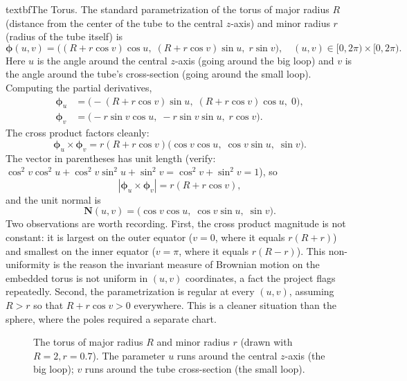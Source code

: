 \documentclass{article}
\begin{document}
textbf{The Torus.} The standard parametrization of the torus of major radius $R$ (distance from the center of the tube to the central $z$-axis) and minor radius $r$ (radius of the tube itself) is
$$\boldsymbol{\phi}(u, v) = \big((R + r\cos v)\cos u,\; (R + r\cos v)\sin u,\; r\sin v\big), \quad (u, v) \in [0, 2\pi) \times [0, 2\pi).$$
Here $u$ is the angle around the central $z$-axis (going around the big loop) and $v$ is the angle around the tube's cross-section (going around the small loop). Computing the partial derivatives,
\begin{align*}
\boldsymbol{\phi}_u &= \big(-(R + r\cos v)\sin u,\; (R + r\cos v)\cos u,\; 0\big), \\
\boldsymbol{\phi}_v &= \big(-r\sin v\cos u,\; -r\sin v\sin u,\; r\cos v\big).
\end{align*}
The cross product factors cleanly:
$$\boldsymbol{\phi}_u \times \boldsymbol{\phi}_v = r(R + r\cos v)\big(\cos v\cos u,\; \cos v\sin u,\; \sin v\big).$$
The vector in parentheses has unit length (verify: $\cos^2 v\cos^2 u + \cos^2 v\sin^2 u + \sin^2 v = \cos^2 v + \sin^2 v = 1$), so
$$|\boldsymbol{\phi}_u \times \boldsymbol{\phi}_v| = r(R + r\cos v),$$
and the unit normal is
$$\mathbf{N}(u, v) = \big(\cos v\cos u,\; \cos v\sin u,\; \sin v\big).$$
Two observations are worth recording. First, the cross product magnitude is not constant: it is largest on the outer equator ($v = 0$, where it equals $r(R + r)$) and smallest on the inner equator ($v = \pi$, where it equals $r(R - r)$). This non-uniformity is the reason the invariant measure of Brownian motion on the embedded torus is not uniform in $(u, v)$ coordinates, a fact the project flags repeatedly. Second, the parametrization is regular at every $(u, v)$, assuming $R > r$ so that $R + r\cos v > 0$ everywhere. This is a cleaner situation than the sphere, where the poles required a separate chart.
 
\begin{figure}[H]
\centering
{}
\caption{The torus of major radius $R$ and minor radius $r$ (drawn with $R = 2, r = 0.7$). The parameter $u$ runs around the central $z$-axis (the big loop); $v$ runs around the tube cross-section (the small loop).}
\label{fig:torus-3d}
\end{figure}
 
\end{document}
